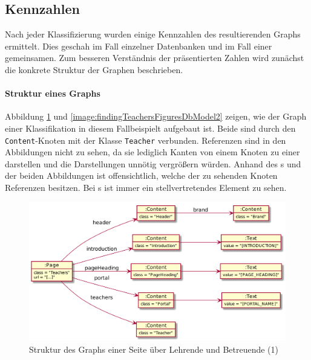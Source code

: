 \subsection{Kennzahlen}
    Nach jeder Klassifizierung wurden einige Kennzahlen des
    resultierenden Graphs ermittelt.
    Dies geschah im Fall einzelner Datenbanken und im Fall
    einer gemeinsamen.
    Zum besseren Verständnis der präsentierten Zahlen wird
    zunächst die konkrete Struktur der Graphen beschrieben.

    \paragraph{Struktur eines Graphs}
    Abbildung \ref{image:findingTeachersFiguresDbModel1}
    und \ref{image:findingTeachersFiguresDbModel2} zeigen,
    wie der Graph einer Klassifikation in diesem Fallbeispielt aufgebaut ist.
    Beide sind durch den \texttt{Content}-Knoten mit der Klasse \texttt{Teacher} verbunden.
    Referenzen sind in den Abbildungen nicht zu sehen,
    da sie lediglich Kanten von einem Knoten zu einer {\resource} darstellen
    und die Darstellungen unnötig vergrößern würden.
    Anhand des {\classificationModel}s und der beiden Abbildungen ist
    offensichtlich, welche der zu sehenden Knoten Referenzen besitzen.
    Bei {\collectionFeature}s ist immer ein stellvertretendes Element zu sehen.

    \begin{figure}[htb]
        \centering
        \includegraphics[scale=\imageScalingFactor]{../resources/findings/case-study-1/dbmodel/dbmodel1.png}
        \caption{Struktur des Graphs einer Seite über Lehrende und Betreuende (1)}
        \label{image:findingTeachersFiguresDbModel1}
    \end{figure}

